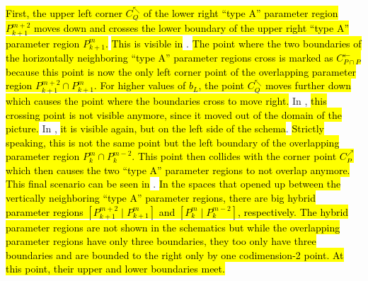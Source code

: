 \hl{
First, the upper left corner $C_Q^\nwarrow$ of the lower right ``type A'' parameter region $P^{m+2}_{k+1}$ moves down and crosses the lower boundary of the upper right ``type A'' parameter region $P^m_{k+1}$.
}
\hl{This is visible in} .
\hl{
	The point where the two boundaries of the horizontally neighboring ``type A'' parameter regions cross is marked as $C_{P \cap P}^\leftarrow$ because this point is now the only left corner point of the overlapping parameter region $P^{m+2}_{k+1} \cap P^{m}_{k+1}$.
	For higher values of $b_L$, the point $C_Q^\nwarrow$ moves further down which causes the point where the boundaries cross to move right.
}
In , \hl{this crossing point is not visible anymore, since it moved out of the domain of the picture.}
In , \hl{it is visible again, but on the left side of the schema}.
\hl{
	Strictly speaking, this is not the same point but the left boundary of the overlapping parameter region $P^m_k \cap P^{m-2}_{k}$.
	This point then collides with the corner point $C_P^\nearrow$ which then causes the two ``type A'' parameter regions to not overlap anymore.
}
\hl{This final scenario can be seen in} .
\hl{
	In the spaces that opened up between the vertically neighboring ``type A'' parameter regions, there are big hybrid parameter regions $\left[P^{m+2}_{k+1} \mid P^{m}_{k+1}\right]$ and $\left[P^m_k \mid P^{m-2}_k\right]$, respectively.
	The hybrid parameter regions are not shown in the schematics but while the overlapping parameter regions have only three boundaries, they too only have three boundaries and are bounded to the right only by one codimension-2 point.
	At this point, their upper and lower boundaries meet.
}

